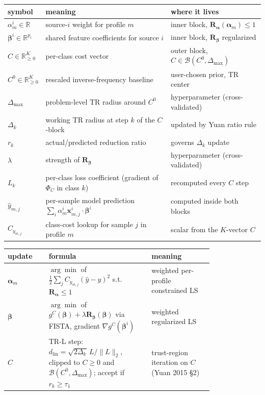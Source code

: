 \documentclass[11pt,a4paper]{article}
\begin{document}
\begin{center}
\small
\begin{tabular}{lll}
\toprule
\textbf{symbol} & \textbf{meaning} & \textbf{where it lives} \\
\midrule
$\alpha^i_m \in \mathbb{R}$ & source-$i$ weight for profile $m$ & inner block, $\mathbf{R}_{\boldsymbol{\alpha}}(\boldsymbol{\alpha}_m) \leq 1$ \\
$\boldsymbol{\beta}^i \in \mathbb{R}^{p_i}$ & shared feature coefficients for source $i$ & inner block, $\mathbf{R}_{\boldsymbol{\beta}}$ regularized \\
$C \in \mathbb{R}^K_{\ge 0}$ & per-class cost vector & outer block, $C \in \mathcal B(C^0,\Delta_{\max})$ \\
$C^0 \in \mathbb{R}^K_{\ge 0}$ & rescaled inverse-frequency baseline & user-chosen prior, TR center \\
$\Delta_{\max}$ & problem-level TR radius around $C^0$ & hyperparameter (cross-validated) \\
$\Delta_k$ & working TR radius at step $k$ of the $C$-block & updated by Yuan ratio rule \\
$r_k$ & actual/predicted reduction ratio & governs $\Delta_k$ update \\
$\lambda$ & strength of $\mathbf{R}_{\boldsymbol{\beta}}$ & hyperparameter (cross-validated) \\
$L_k$ & per-class loss coefficient (gradient of $\Phi_C$ in class $k$) & recomputed every $C$ step \\
$\hat{y}_{m,j}$ & per-sample model prediction $\sum_i \alpha^i_m \mathbf{x}^i_{m,j} \cdot \boldsymbol{\beta}^i$ & computed inside both blocks \\
$C_{y_{m,j}}$ & class-cost lookup for sample $j$ in profile $m$ & scalar from the $K$-vector $C$ \\
\bottomrule
\end{tabular}
\end{center}

\bigskip

\begin{center}
\small
\begin{tabular}{lp{0.50\linewidth}p{0.30\linewidth}}
\toprule
\textbf{update} & \textbf{formula} & \textbf{meaning} \\
\midrule
$\boldsymbol{\alpha}_m$ & $\arg\min$ of $\frac{1}{2}\sum_j C_{y_{m,j}}(\hat{y}-y)^2$ s.t.\ $\mathbf{R}_{\boldsymbol{\alpha}} \leq 1$ & weighted per-profile constrained LS \\
$\boldsymbol{\beta}$ & $\arg\min$ of $g^C(\boldsymbol{\beta}) + \lambda \mathbf{R}_{\boldsymbol{\beta}}(\boldsymbol{\beta})$ via FISTA, gradient $\nabla g^C(\boldsymbol{\beta}^i)$ & weighted regularized LS \\
$C$ & TR-L step: $d_{\mathrm{lin}} = \sqrt{2\Delta_k}\,L/\|L\|_2$, clipped to $C\ge 0$ and $\mathcal B(C^0,\Delta_{\max})$; accept if $r_k \ge \tau_1$ & trust-region iteration on $C$ (Yuan 2015 \S 2) \\
\bottomrule
\end{tabular}
\end{center}
\end{document}
